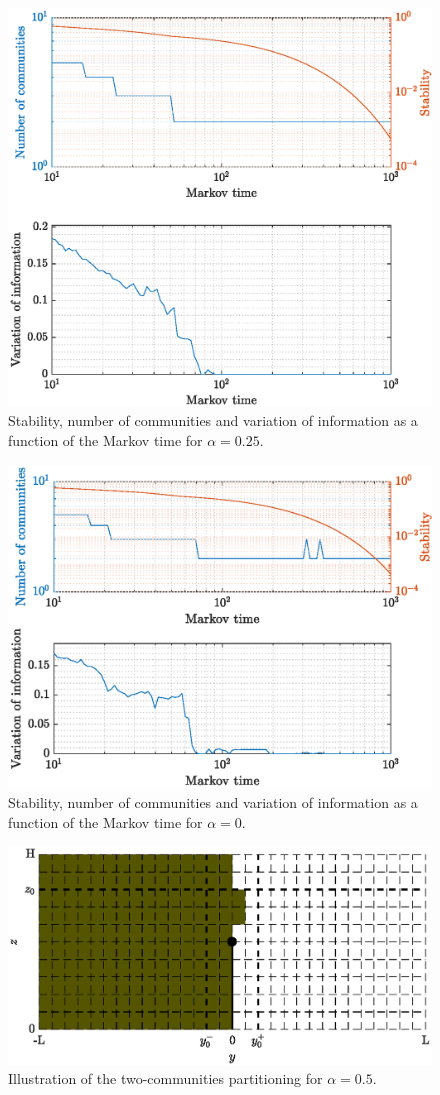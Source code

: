 \begin{figure}[!htp]
	\centering
	\includegraphics[width = .7\textwidth, height = .4\textheight]{fig/problem2box/stab_a25.eps}
	\caption{Stability, number of communities and variation of information as a function of the Markov time for $\alpha = 0.25$.}
	\label{fig:staba25}
\end{figure}

\begin{figure}[!htp]
	\centering
	\includegraphics[width = .7\textwidth, height = .4\textheight]{fig/problem2box/stab_a0.eps}
	\caption{Stability, number of communities and variation of information as a function of the Markov time for $\alpha = 0$.}
	\label{fig:staba0}
\end{figure}

\begin{figure}[!htp]
	\centering
	\includegraphics[width = .7\textwidth]{fig/problem2box/cluster_a5_2_.eps}
	\caption{Illustration of the two-communities partitioning for $\alpha = 0.5$.}
	\label{fig:cluster_a5_2}
\end{figure}

